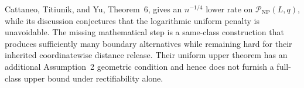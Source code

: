 Cattaneo, Titiunik, and Yu, Theorem~6, gives an \(n^{-1/4}\) lower rate on \(\mathcal P_{\mathrm{NP}}(L,q)\), while its discussion conjectures that the logarithmic uniform penalty is unavoidable.  The missing mathematical step is a same-class construction that produces sufficiently many boundary alternatives while remaining hard for their inherited coordinatewise distance release.  Their uniform upper theorem has an additional Assumption~2 geometric condition and hence does not furnish a full-class upper bound under rectifiability alone.